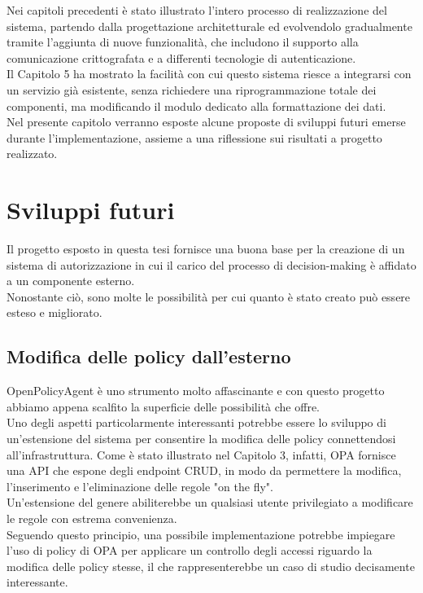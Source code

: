 Nei capitoli precedenti è stato illustrato l'intero processo di realizzazione del sistema, partendo dalla
progettazione architetturale ed evolvendolo gradualmente tramite l'aggiunta di nuove funzionalità, che includono il supporto alla comunicazione crittografata 
e a differenti tecnologie di autenticazione. 
\\ Il Capitolo 5 ha mostrato la facilità 
con cui questo sistema riesce a integrarsi con un servizio già esistente, senza richiedere una 
riprogrammazione totale dei componenti, ma modificando il modulo dedicato alla formattazione dei dati. 
\\ Nel presente capitolo verranno esposte alcune proposte di sviluppi futuri emerse durante l'implementazione, assieme a una riflessione
 sui risultati a progetto realizzato. 

\section{Sviluppi futuri}
Il progetto esposto in questa tesi fornisce una buona base per la creazione di un sistema di autorizzazione 
in cui il carico del processo di decision-making è affidato a un componente esterno.  
\\ Nonostante ciò, sono molte le possibilità per cui quanto è stato creato può essere esteso e migliorato. 

\subsection{Modifica delle policy dall'esterno}
OpenPolicyAgent è uno strumento molto affascinante e con questo progetto abbiamo 
appena scalfito la superficie delle possibilità che offre. \\ Uno degli aspetti particolarmente interessanti 
potrebbe essere lo sviluppo di un'estensione del sistema per consentire la modifica delle policy connettendosi all'infrastruttura. 
Come è stato illustrato nel Capitolo 3, infatti, OPA fornisce una API che espone degli 
endpoint CRUD, in modo da permettere la modifica, l'inserimento e l'eliminazione delle regole "on the fly".
\\Un'estensione del genere abiliterebbe un qualsiasi utente privilegiato a modificare le regole con estrema
 convenienza.   
\\ Seguendo questo principio, una possibile implementazione potrebbe impiegare l'uso di policy di OPA per applicare un controllo degli accessi 
riguardo la modifica delle policy stesse, il che rappresenterebbe un caso di studio decisamente interessante. 

